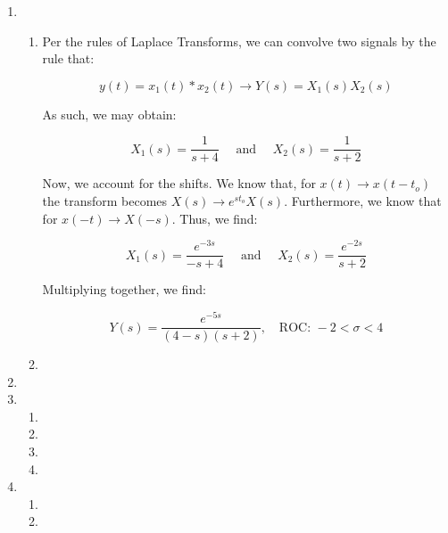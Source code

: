 \begin{enumerate}

  \item

    \begin{enumerate}

      \item Per the rules of Laplace Transforms, we can convolve two signals by the rule that:

        $$y(t)=x_1(t)*x_2(t)\to Y(s)=X_1(s)X_2(s)$$

        As such, we may obtain:

        $$X_1(s)=\frac{1}{s+4}\quad\text{ and }\quad X_2(s)=\frac{1}{s+2}$$

        Now, we account for the shifts. We know that, for $x(t)\to x(t-t_o)$ the transform becomes $X(s)\to e^{st_o}X(s)$. Furthermore, we know that for $x(-t)\to X(-s)$. Thus, we find:

        $$X_1(s)=\frac{e^{-3s}}{-s+4}\quad\text{ and }\quad X_2(s)=\frac{e^{-2s}}{s+2}$$

        Multiplying together, we find:

        $$\boxed{Y(s)=\frac{e^{-5s}}{(4-s)(s+2)},\quad\text{ROC: } -2<\sigma<4}$$

      \item 

    \end{enumerate}

  \item

  \item

    \begin{enumerate}

      \item 

      \item 

      \item 

      \item 

    \end{enumerate}

  \item

    \begin{enumerate}

      \item 

      \item 


\end{enumerate}
\end{enumerate}
